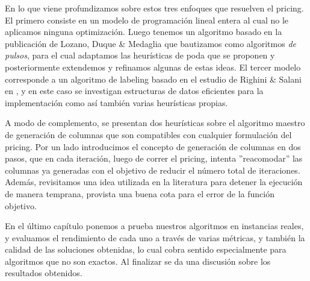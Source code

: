 En lo que viene profundizamos sobre estos tres enfoques que resuelven el pricing. El primero consiste en un modelo de programación lineal entera al cual no le aplicamos ninguna optimización. Luego tenemos un algoritmo basado en la publicación de Lozano, Duque \& Medaglia \cite{lozano-duque-medaglia} que bautizamos como algoritmos \emph{de pulsos}, para el cual adaptamos las heurísticas de poda que se proponen y posteriormente extendemos y refinamos algunas de estas ideas. El tercer modelo corresponde a un algoritmo de labeling basado en el estudio de Righini \& Salani en \cite{righini-salani}, y en este caso se investigan estructuras de datos eficientes para la implementación como así también varias heurísticas propias. 

A modo de complemento, se presentan dos heurísticas sobre el algoritmo maestro de generación de columnas que son compatibles con cualquier formulación del pricing. Por un lado introducimos el concepto de generación de columnas en dos pasos, que en cada iteración, luego de correr el pricing, intenta ''reacomodar'' las columnas ya generadas con el objetivo de reducir el número total de iteraciones. Además, revisitamos una idea utilizada en la literatura para detener la ejecución de manera temprana, provista una buena cota para el error de la función objetivo.

En el último capítulo ponemos a prueba nuestros algoritmos en instancias reales, y evaluamos el rendimiento de cada uno a través de varias métricas, y también la calidad de las soluciones obtenidas, lo cual cobra sentido especialmente para algoritmos que no son exactos. Al finalizar se da una discusión sobre los resultados obtenidos.
